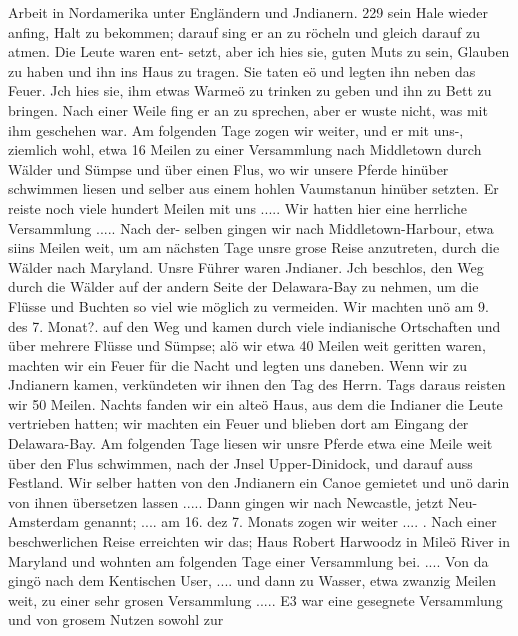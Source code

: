 Arbeit in Nordamerika unter Engländern und Jndianern. 229
sein Hale wieder anfing, Halt zu bekommen; darauf sing er an
zu röcheln und gleich darauf zu atmen. Die Leute waren ent-
setzt, aber ich hies sie, guten Muts zu sein, Glauben zu haben
und ihn ins Haus zu tragen. Sie taten eö und legten ihn neben
das Feuer. Jch hies sie, ihm etwas Warmeö zu trinken zu geben
und ihn zu Bett zu bringen. Nach einer Weile fing er an zu sprechen,
aber er wuste nicht, was mit ihm geschehen war. Am folgenden
Tage zogen wir weiter, und er mit uns-, ziemlich wohl, etwa
16 Meilen zu einer Versammlung nach Middletown durch Wälder
und Sümpse und über einen Flus, wo wir unsere Pferde hinüber
schwimmen liesen und selber aus einem hohlen Vaumstanun hinüber
setzten. Er reiste noch viele hundert Meilen mit uns .....
Wir hatten hier eine herrliche Versammlung ..... Nach der-
selben gingen wir nach Middletown-Harbour, etwa siins Meilen weit,
um am nächsten Tage unsre grose Reise anzutreten, durch die
Wälder nach Maryland. Unsre Führer waren Jndianer. Jch
beschlos, den Weg durch die Wälder auf der andern Seite der
Delawara-Bay zu nehmen, um die Flüsse und Buchten so viel wie
möglich zu vermeiden. Wir machten unö am 9. des 7. Monat?.
auf den Weg und kamen durch viele indianische Ortschaften und über
mehrere Flüsse und Sümpse; alö wir etwa 40 Meilen weit
geritten waren, machten wir ein Feuer für die Nacht und legten
uns daneben. Wenn wir zu Jndianern kamen, verkündeten
wir ihnen den Tag des Herrn. Tags daraus reisten wir 50 Meilen.
Nachts fanden wir ein alteö Haus, aus dem die Indianer die
Leute vertrieben hatten; wir machten ein Feuer und blieben dort
am Eingang der Delawara-Bay. Am folgenden Tage liesen wir
unsre Pferde etwa eine Meile weit über den Flus schwimmen,
nach der Jnsel Upper-Dinidock, und darauf auss Festland. Wir
selber hatten von den Jndianern ein Canoe gemietet und unö
darin von ihnen übersetzen lassen .....
Dann gingen wir nach Newcastle, jetzt Neu-Amsterdam
genannt; .... am 16. dez 7. Monats zogen wir weiter .... .
Nach einer beschwerlichen Reise erreichten wir das; Haus Robert
Harwoodz in Mileö River in Maryland und wohnten am
folgenden Tage einer Versammlung bei. .... Von da gingö
nach dem Kentischen User, .... und dann zu Wasser, etwa zwanzig
Meilen weit, zu einer sehr grosen Versammlung ..... E3 war
eine gesegnete Versammlung und von grosem Nutzen sowohl zur

